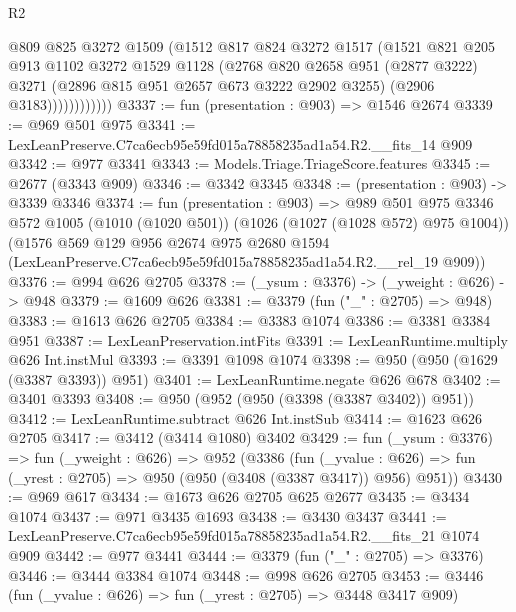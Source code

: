 \begin{lexlean}{R2}
\begin{coremodule}
                    @809
                    @825
                    @3272
                    @1509
                    (@1512
                      @817
                      @824
                      @3272
                      @1517
                      (@1521
                        @821
                        @205
                        @913
                        @1102
                        @3272
                        @1529
                        @1128
                        (@2768
                          @820
                          @2658
                          @951
                          (@2877 @3222)
                          @3271
                          (@2896 @815 @951 @2657 @673 @3222 @2902 @3255)
                          (@2906 @3183))))))))))))
@3337 := fun (presentation : @903) => @1546 @2674
@3339 := @969 @501 @975
@3341 := LexLeanPreserve.C7ca6ecb95e59fd015a78858235ad1a54.R2.__fits_14 @909
@3342 := @977 @3341
@3343 := Models.Triage.TriageScore.features
@3345 := @2677 (@3343 @909)
@3346 := @3342 @3345
@3348 := (presentation : @903) -> @3339 @3346
@3374 := fun (presentation : @903) =>
  @989
    @501
    @975
    @3346
    @572
    @1005
    (@1010 (@1020 @501))
    (@1026 (@1027 (@1028 @572) @975 @1004))
    (@1576
      @569
      @129
      @956
      @2674
      @975
      @2680
      @1594
      (LexLeanPreserve.C7ca6ecb95e59fd015a78858235ad1a54.R2.__rel_19 @909))
@3376 := @994 @626 @2705
@3378 := (_ysum : @3376) -> (_yweight : @626) -> @948
@3379 := @1609 @626
@3381 := @3379 (fun ("_" : @2705) => @948)
@3383 := @1613 @626 @2705
@3384 := @3383 @1074
@3386 := @3381 @3384 @951
@3387 := LexLeanPreservation.intFits
@3391 := LexLeanRuntime.multiply @626 Int.instMul
@3393 := @3391 @1098 @1074
@3398 := @950 (@950 (@1629 (@3387 @3393)) @951)
@3401 := LexLeanRuntime.negate @626 @678
@3402 := @3401 @3393
@3408 := @950 (@952 (@950 (@3398 (@3387 @3402)) @951))
@3412 := LexLeanRuntime.subtract @626 Int.instSub
@3414 := @1623 @626 @2705
@3417 := @3412 (@3414 @1080) @3402
@3429 := fun (_ysum : @3376) =>
  fun (_yweight : @626) =>
  @952
    (@3386
      (fun (_yvalue : @626) => fun (_yrest : @2705) => @950 (@950 (@3408 (@3387 @3417)) @956) @951))
@3430 := @969 @617
@3434 := @1673 @626 @2705 @625 @2677
@3435 := @3434 @1074
@3437 := @971 @3435 @1693
@3438 := @3430 @3437
@3441 := LexLeanPreserve.C7ca6ecb95e59fd015a78858235ad1a54.R2.__fits_21 @1074 @909
@3442 := @977 @3441
@3444 := @3379 (fun ("_" : @2705) => @3376)
@3446 := @3444 @3384 @1074
@3448 := @998 @626 @2705
@3453 := @3446 (fun (_yvalue : @626) => fun (_yrest : @2705) => @3448 @3417 @909)

\end{coremodule}
\end{lexlean}
